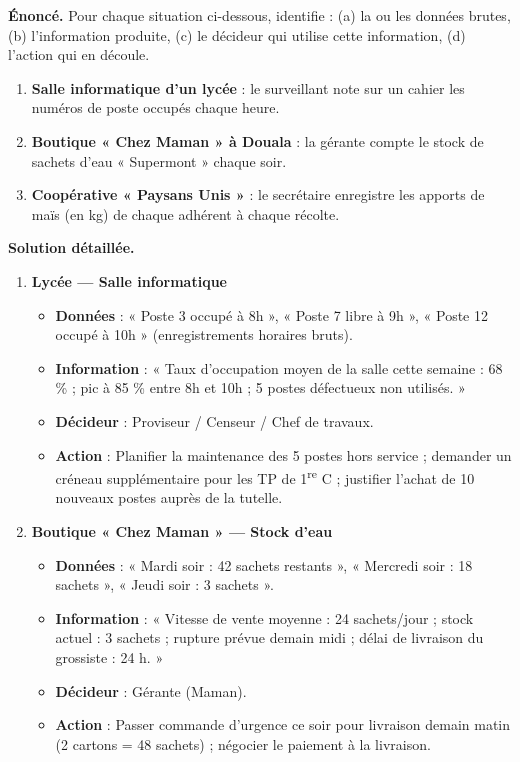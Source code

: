 \documentclass[11pt]{article}
\begin{document}
\begin{exoresolu}
\textbf{Énoncé.} Pour chaque situation ci-dessous, identifie : (a) la ou les données brutes, (b) l'information produite, (c) le décideur qui utilise cette information, (d) l'action qui en découle.

\begin{enumerate}
    \item \textbf{Salle informatique d'un lycée} : le surveillant note sur un cahier les numéros de poste occupés chaque heure.
    \item \textbf{Boutique « Chez Maman » à Douala} : la gérante compte le stock de sachets d'eau « Supermont » chaque soir.
    \item \textbf{Coopérative « Paysans Unis »} : le secrétaire enregistre les apports de maïs (en kg) de chaque adhérent à chaque récolte.
\end{enumerate}

\tcblower

\textbf{Solution détaillée.}

\begin{enumerate}
    \item \textbf{Lycée — Salle informatique}
    \begin{itemize}
        \item \textbf{Données} : « Poste 3 occupé à 8h », « Poste 7 libre à 9h », « Poste 12 occupé à 10h » (enregistrements horaires bruts).
        \item \textbf{Information} : « Taux d'occupation moyen de la salle cette semaine : 68 \% ; pic à 85 \% entre 8h et 10h ; 5 postes défectueux non utilisés. »
        \item \textbf{Décideur} : Proviseur / Censeur / Chef de travaux.
        \item \textbf{Action} : Planifier la maintenance des 5 postes hors service ; demander un créneau supplémentaire pour les TP de 1\textsuperscript{re} C ; justifier l'achat de 10 nouveaux postes auprès de la tutelle.
    \end{itemize}

    \item \textbf{Boutique « Chez Maman » — Stock d'eau}
    \begin{itemize}
        \item \textbf{Données} : « Mardi soir : 42 sachets restants », « Mercredi soir : 18 sachets », « Jeudi soir : 3 sachets ».
        \item \textbf{Information} : « Vitesse de vente moyenne : 24 sachets/jour ; stock actuel : 3 sachets ; rupture prévue demain midi ; délai de livraison du grossiste : 24 h. »
        \item \textbf{Décideur} : Gérante (Maman).
        \item \textbf{Action} : Passer commande d'urgence ce soir pour livraison demain matin (2 cartons = 48 sachets) ; négocier le paiement à la livraison.
    \end{itemize}


\end{enumerate}
\end{exoresolu}
\end{document}
